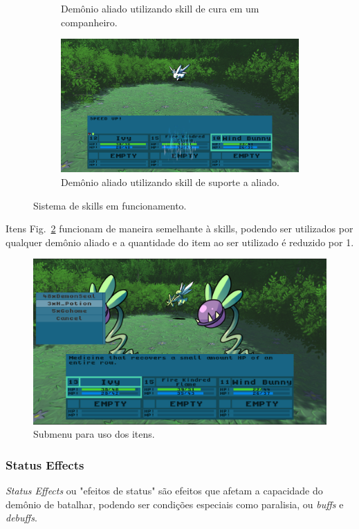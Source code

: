 \begin{figure}[h!]
\begin{subfigure}[b]{0.49\linewidth}
    \caption{Demônio aliado utilizando skill de cura em um companheiro.}
  \end{subfigure}
  \begin{subfigure}[b]{0.49\linewidth}
    \includegraphics[width=\linewidth]{support.jpg}
    \caption{Demônio aliado utilizando skill de suporte a aliado.}
  \end{subfigure}
  \caption{Sistema de skills em funcionamento.}
  \label{fig:battle2}
\end{figure}

Itens Fig.~\ref{fig:itens} funcionam de maneira semelhante à skills, podendo ser utilizados por qualquer demônio aliado e a quantidade do item ao ser utilizado é reduzido por 1.

\begin{figure}[h!]
 \centering
  \includegraphics[width=0.5\linewidth]{itemmenu.jpg}
  \caption{Submenu para uso dos itens.}
  \label{fig:itens}
\end{figure}

\subsubsection{Status Effects}

\emph{Status Effects} ou "efeitos de status" são efeitos que afetam a capacidade do demônio de batalhar, podendo ser condições especiais como paralisia, ou \emph{buffs} e \emph{debuffs}.

